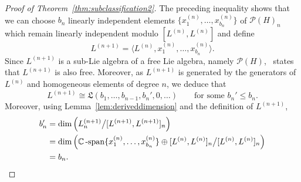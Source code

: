 \documentclass[11pt]{amsart}
\theoremstyle{definition}
\numberwithin{equation}{section}
\def\CC{{\mathbb C}}
\begin{document}
\begin{proof}[Proof of Theorem~\ref{thm:subclassification2}]
The preceding inequality shows that we can choose $b_{n}$ linearly independent elements $\{x^{(n)}_{1}, \ldots, x^{(n)}_{b_{n}}\}$ of $\mathcal{P}(H)_{n}$ which remain linearly independent modulo $[L^{(n)}, L^{(n)}]$ and define
\[
L^{(n+1)} = \langle L^{(n)}, x^{(n)}_{1}, \ldots, x^{(n)}_{b_{n}} \rangle.
\]
Since $L^{(n+1)}$ is a sub-Lie algebra of a free Lie algebra, namely $\mathcal{P}(H)$,~\cite[Theorem 2.2]{MSZ} states that $L^{(n+1)}$ is also free.  
Moreover, as $L^{(n+1)}$ is generated by the generators of $L^{(n)}$ and homogeneous elements of degree $n$, we deduce that
\[
L^{(n+1)} \cong \mathfrak{L}(b_{1}, \ldots, b_{n-1}, b_{n}', 0, \ldots )
\qquad\text{for some $b_{n}' \le b_{n}$}.
\]
Moreover, using Lemma~\ref{lem:deriveddimension} and the definition of $L^{(n+1)}$,
\begin{align*}
b_{n}' &= \dim\left( L^{(n+1)}_{n} \big/ [L^{(n+1)}, L^{(n+1)}]_{n}\right) \\
&= \dim\left(  \CC\operatorname{-span}\{x^{(n)}_{1}, \ldots, x^{(n)}_{b_{n}}\} \oplus [L^{(n)}, L^{(n)}]_{n} \big/ [L^{(n)}, L^{(n)}]_{n} \right) \\
&= b_{n}. \qedhere
\end{align*}
\end{proof}
\end{document}
